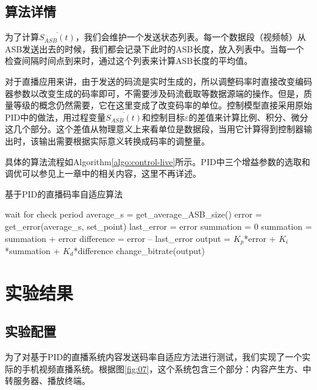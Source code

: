 \subsection{算法详情}

为了计算$\overline{S_{ASB}(t)}$，我们会维护一个发送状态列表。每一个数据段（视频帧）从ASB发送出去的时候，我们都会记录下此时的ASB长度，放入列表中。当每一个检查间隔时间点到来时，通过这个列表来计算ASB长度的平均值。

对于直播应用来讲，由于发送的码流是实时生成的，所以调整码率时直接改变编码器参数以改变生成的码率即可，不需要涉及码流截取等数据源端的操作。但是，质量等级的概念仍然需要，它在这里变成了改变码率的单位。控制模型直接采用原始PID中的做法，用过程变量$\overline{S_{ASB}(t)}$和控制目标$\varepsilon$的差值来计算比例、积分、微分这几个部分。这个差值从物理意义上来看单位是数据段，当用它计算得到控制器输出时，该输出需要根据实际意义转换成码率的调整量。

具体的算法流程如Algorithm\ref{algo:control-live}所示。PID中三个增益参数的选取和调优可以参见上一章中的相关内容，这里不再详述。

\vspace{10pt}
\begin{algorithm}
	\vspace{10pt}
	\caption{基于PID的直播码率自适应算法}
	\label{algo:control-live}
	\begin{algorithmic}
		\STATE wait for check period
		\STATE average\_s = get\_average\_ASB\_size()
		\STATE error = get\_error(average\_s, set\_point)
			\STATE last\_error = error
			\STATE summation = 0
		\ELSE
			\STATE summation = summation + error
			\STATE difference = error – last\_error
			\STATE output = $K_p$*error + $K_i$*summation + $K_d$*difference
			\STATE change\_bitrate(output)
		\ENDIF
		\ENDWHILE
	\end{algorithmic}
	\vspace{10pt}
\end{algorithm}
\vspace{10pt}
	
\section{实验结果}

\subsection{实验配置}

为了对基于PID的直播系统内容发送码率自适应方法进行测试，我们实现了一个实际的手机视频直播系统。根据图\ref{fig:07}，这个系统包含三个部分：内容产生方、中转服务器、播放终端。

